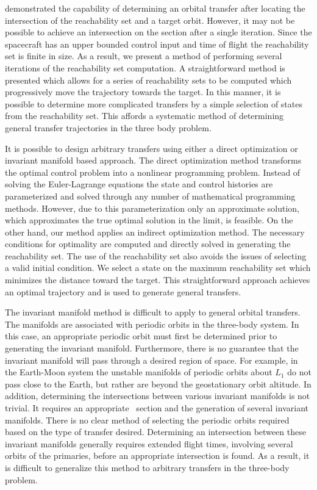 \documentclass[smallcondensed]{svjour3}
\begin{document}
 demonstrated the capability of determining an orbital transfer after locating the intersection of the reachability set and a target orbit.
However, it may not be possible to achieve an intersection on the \Poincare section after a single iteration. 
Since the spacecraft has an upper bounded control input and time of flight the reachability set is finite in size. 
As a result, we present a method of performing several iterations of the reachability set computation. 
A straightforward method is presented which allows for a series of reachability sets to be computed which progressively move the trajectory towards the target.
In this manner, it is possible to determine more complicated transfers by a simple selection of states from the reachability set.
This affords a systematic method of determining general transfer trajectories in the three body problem.

It is possible to design arbitrary transfers using either a direct optimization or invariant manifold based approach.
The direct optimization method transforms the optimal control problem into a nonlinear programming problem.
Instead of solving the Euler-Lagrange equations the state and control histories are parameterized and solved through any number of mathematical programming methods.
However, due to this parameterization only an approximate solution, which approximates the true optimal solution in the limit, is feasible. 
On the other hand, our method applies an indirect optimization method.
The necessary conditions for optimality are computed and directly solved in generating the reachability set. 
The use of the reachability set also avoids the issues of selecting a valid initial condition.
We select a state on the maximum reachability set which minimizes the distance toward the target. 
This straightforward approach achieves an optimal trajectory and is used to generate general transfers.

The invariant manifold method is difficult to apply to general orbital transfers. 
The manifolds are associated with periodic orbits in the three-body system. 
In this case, an appropriate periodic orbit must first be determined prior to generating the invariant manifold.
Furthermore, there is no guarantee that the invariant manifold will pass through a desired region of space. 
For example, in the Earth-Moon system the unstable manifolds of periodic orbits about \( L_1 \) do not pass close to the Earth, but rather are beyond the geostationary orbit altitude. 
In addition, determining the intersections between various invariant manifolds is not trivial. 
It requires an appropriate \Poincare~section and the generation of several invariant manifolds.
There is no clear method of selecting the periodic orbits required based on the type of transfer desired. 
Determining an intersection between these invariant manifolds generally requires extended flight times, involving several orbits of the primaries, before an appropriate intersection is found.
As a result, it is difficult to generalize this method to arbitrary transfers in the three-body problem.
\end{document}
